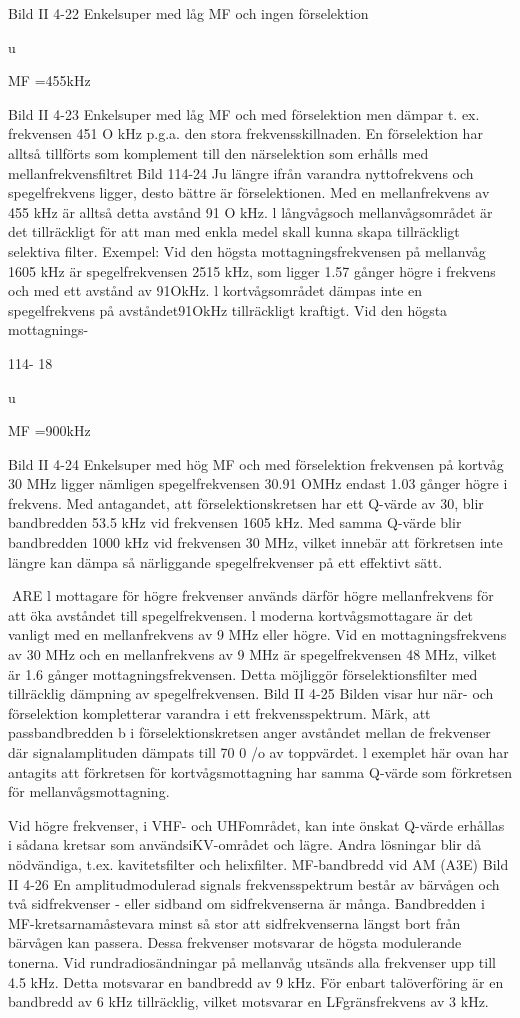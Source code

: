 Bild II 4-22 Enkelsuper med låg MF och ingen förselektion

u

MF =455kHz

Bild II 4-23 Enkelsuper med låg MF och med förselektion
men dämpar t. ex. frekvensen 451 O
kHz p.g.a. den stora frekvensskillnaden. En förselektion har alltså tillförts
som komplement till den närselektion
som erhålls med mellanfrekvensfiltret
Bild 114-24
Ju längre ifrån varandra nyttofrekvens och spegelfrekvens ligger,
desto bättre är förselektionen. Med en
mellanfrekvens av 455 kHz är alltså
detta avstånd 91 O kHz. l långvågsoch mellanvågsområdet är det tillräckligt för att man med enkla medel skall
kunna skapa tillräckligt selektiva filter.
Exempel:
Vid den högsta mottagningsfrekvensen på mellanvåg 1605 kHz är
spegelfrekvensen 2515 kHz, som ligger 1.57 gånger högre i frekvens och
med ett avstånd av 91OkHz. l kortvågsområdet dämpas inte en spegelfrekvens på avståndet91OkHz tillräckligt
kraftigt. Vid den högsta mottagnings-

114- 18

u

MF =900kHz

Bild II 4-24 Enkelsuper med hög MF och
med förselektion
frekvensen på kortvåg 30 MHz ligger nämligen
spegelfrekvensen 30.91 OMHz endast 1.03 gånger
högre i frekvens. Med antagandet, att förselektionskretsen har ett Q-värde av 30, blir bandbredden 53.5 kHz vid frekvensen 1605 kHz.
Med samma Q-värde blir bandbredden 1000
kHz vid frekvensen 30 MHz, vilket innebär att
förkretsen inte längre kan dämpa så närliggande
spegelfrekvenser på ett effektivt sätt.

ARE
l mottagare för högre frekvenser används
därför högre mellanfrekvens för att öka avståndet till spegelfrekvensen. l moderna
kortvågsmottagare är det vanligt med en
mellanfrekvens av 9 MHz eller högre. Vid en
mottagningsfrekvens av 30 MHz och en
mellanfrekvens av 9 MHz är spegelfrekvensen 48 MHz, vilket är 1.6 gånger mottagningsfrekvensen. Detta möjliggör förselektionsfilter med tillräcklig dämpning av spegelfrekvensen.
Bild II 4-25
Bilden visar hur när- och förselektion kompletterar varandra i ett frekvensspektrum.
Märk, att passbandbredden b i förselektionskretsen anger avståndet mellan de frekvenser där signalamplituden dämpats till 70
0
/o av toppvärdet. l exemplet här ovan har
antagits att förkretsen för kortvågsmottagning har samma Q-värde som förkretsen för
mellanvågsmottagning.

Vid högre frekvenser, i VHF- och UHFområdet, kan inte önskat Q-värde erhållas i
sådana kretsar som användsiKV-området
och lägre. Andra lösningar blir då nödvändiga, t.ex. kavitetsfilter och helixfilter.
MF-bandbredd vid AM (A3E)
Bild II 4-26
En amplitudmodulerad signals frekvensspektrum består av bärvågen och två sidfrekvenser - eller sidband om sidfrekvenserna är många.
Bandbredden i MF-kretsarnamåstevara
minst så stor att sidfrekvenserna längst bort
från bärvågen kan passera. Dessa frekvenser motsvarar de högsta modulerande tonerna. Vid rundradiosändningar på mellanvåg utsänds alla frekvenser upp till 4.5 kHz.
Detta motsvarar en bandbredd av 9 kHz.
För enbart talöverföring är en bandbredd av
6 kHz tillräcklig, vilket motsvarar en LFgränsfrekvens av 3 kHz.

